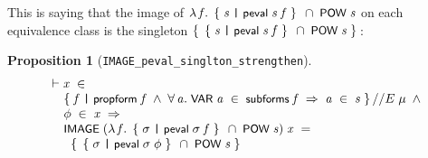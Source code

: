 \documentclass[letterpaper]{article}
\newtheorem{prop}{Proposition}
\renewcommand{\HOLConst}[1]{{\textsf{\upshape\small #1}}}
\renewcommand{\HOLinline}[1]{\ensuremath{#1}}
\newenvironment{holmath}{\begin{displaymath}\begin{array}{l}}{\end{array}\end{displaymath}\ignorespacesafterend}
\begin{document}
This is saying that the image of \HOLinline{\HOLTokenLambda{}\HOLBoundVar{f}.\;\HOLTokenLeftbrace{}\HOLBoundVar{s}\;\HOLTokenBar{}\;\HOLConst{peval}\;\HOLBoundVar{s}\;\HOLBoundVar{f}\HOLTokenRightbrace{}\;\HOLSymConst{\HOLTokenInter{}}\;\HOLConst{POW}\;\HOLFreeVar{s}} on each equivalence class is the singleton \HOLinline{\HOLTokenLeftbrace{}\HOLTokenLeftbrace{}\HOLBoundVar{s}\;\HOLTokenBar{}\;\HOLConst{peval}\;\HOLBoundVar{s}\;\HOLFreeVar{f}\HOLTokenRightbrace{}\;\HOLSymConst{\HOLTokenInter{}}\;\HOLConst{POW}\;\HOLFreeVar{s}\HOLTokenRightbrace{}}:
\begin{prop}[\texttt{IMAGE_peval_singlton_strengthen}]
\begin{holmath}
  \ensuremath{\HOLTokenTurnstile}\HOLFreeVar{x}\;\HOLSymConst{\HOLTokenIn{}}\\
\;\;\;\;\;\HOLTokenLeftbrace{}\HOLBoundVar{f}\;\HOLTokenBar{}\;\HOLConst{propform}\;\HOLBoundVar{f}\;\HOLSymConst{\HOLTokenConj{}}\;\HOLSymConst{\HOLTokenForall{}}\HOLBoundVar{a}.\;\HOLConst{VAR}\;\HOLBoundVar{a}\;\HOLSymConst{\HOLTokenIn{}}\;\HOLConst{subforms}\;\HOLBoundVar{f}\;\HOLSymConst{\HOLTokenImp{}}\;\HOLBoundVar{a}\;\HOLSymConst{\HOLTokenIn{}}\;\HOLFreeVar{s}\HOLTokenRightbrace{}\HOLSymConst{//E}\;\HOLFreeVar{\ensuremath{\mu}}\;\HOLSymConst{\HOLTokenConj{}}\\
\;\;\;\;\;\HOLFreeVar{\ensuremath{\phi}}\;\HOLSymConst{\HOLTokenIn{}}\;\HOLFreeVar{x}\;\HOLSymConst{\HOLTokenImp{}}\\
\;\;\;\;\;\HOLConst{IMAGE}\;(\HOLTokenLambda{}\HOLBoundVar{f}.\;\HOLTokenLeftbrace{}\HOLBoundVar{\ensuremath{\sigma}}\;\HOLTokenBar{}\;\HOLConst{peval}\;\HOLBoundVar{\ensuremath{\sigma}}\;\HOLBoundVar{f}\HOLTokenRightbrace{}\;\HOLSymConst{\HOLTokenInter{}}\;\HOLConst{POW}\;\HOLFreeVar{s})\;\HOLFreeVar{x}\;\HOLSymConst{=}\\
\;\;\;\;\;\;\;\HOLTokenLeftbrace{}\HOLTokenLeftbrace{}\HOLBoundVar{\ensuremath{\sigma}}\;\HOLTokenBar{}\;\HOLConst{peval}\;\HOLBoundVar{\ensuremath{\sigma}}\;\HOLFreeVar{\ensuremath{\phi}}\HOLTokenRightbrace{}\;\HOLSymConst{\HOLTokenInter{}}\;\HOLConst{POW}\;\HOLFreeVar{s}\HOLTokenRightbrace{}
\end{holmath}
\end{prop}
\end{document}
